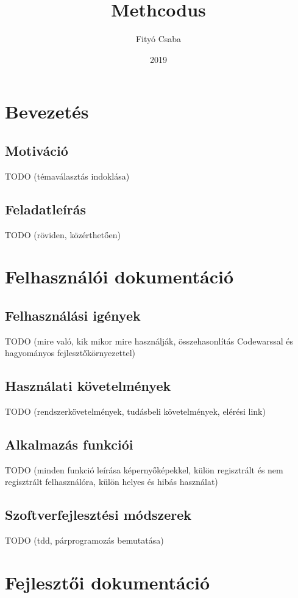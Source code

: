 \documentclass{elteikthesis}
\title{Methcodus}
\date{2019}
\author{Fityó Csaba}
\affiliation{mesteroktató}
\begin{document}
	\maketitle
	\tableofcontents

	\chapter{Bevezetés}
	\section{Motiváció}
	TODO (témaválasztás indoklása)

	\section{Feladatleírás}
	TODO (röviden, közérthetően)

	\chapter{Felhasználói dokumentáció}
	\section{Felhasználási igények}
	TODO (mire való, kik mikor mire használják, összehasonlítás Codewarssal és hagyományos fejlesztőkörnyezettel)
	
	\section{Használati követelmények}
	TODO (rendszerkövetelmények, tudásbeli követelmények, elérési link)
	
	\section{Alkalmazás funkciói}
	TODO (minden funkció leírása képernyőképekkel, külön regisztrált és nem regisztrált felhasználóra, külön helyes és hibás használat)
	
	\section{Szoftverfejlesztési módszerek}
	TODO (tdd, párprogramozás bemutatása)

	\chapter{Fejlesztői dokumentáció}
\end{document}
